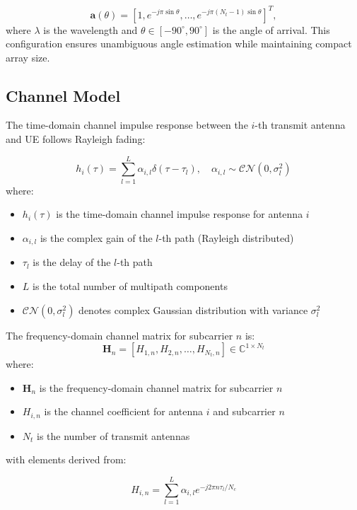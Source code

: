 \documentclass[lettersize,journal]{IEEEtran}
\begin{document}
\begin{equation}
	\mathbf{a}(\theta) = \left[1, e^{-j\pi\sin\theta}, \dots, e^{-j\pi(N_t-1)\sin\theta}\right]^T,
\end{equation}
where $\lambda$ is the wavelength and $\theta \in [-90^\circ, 90^\circ]$ is the angle of arrival. This configuration ensures unambiguous angle estimation while maintaining compact array size.

\subsection{Channel Model}
The time-domain channel impulse response between the $i$-th transmit antenna and UE follows Rayleigh fading:


\begin{equation}
	h_i(\tau) = \sum_{l=1}^L \alpha_{i,l} \delta(\tau-\tau_l), \quad \alpha_{i,l} \sim \mathcal{CN}(0,\sigma_l^2)
	\label{eq:channel_impulse}
\end{equation}
where:
\begin{itemize}
    \item $h_i(\tau)$ is the time-domain channel impulse response for antenna $i$
    \item $\alpha_{i,l}$ is the complex gain of the $l$-th path (Rayleigh distributed)
    \item $\tau_l$ is the delay of the $l$-th path
    \item $L$ is the total number of multipath components
    \item $\mathcal{CN}(0,\sigma_l^2)$ denotes complex Gaussian distribution with variance $\sigma_l^2$
\end{itemize}
The frequency-domain channel matrix for subcarrier $n$ is:
\[
\mathbf{H}_n = \left[H_{1,n}, H_{2,n}, \dots, H_{N_t,n}\right] \in \mathbb{C}^{1 \times N_t}
\]
where:
\begin{itemize}
    \item $\mathbf{H}_n$ is the frequency-domain channel matrix for subcarrier $n$
    \item $H_{i,n}$ is the channel coefficient for antenna $i$ and subcarrier $n$
    \item $N_t$ is the number of transmit antennas
\end{itemize}
with elements derived from:

\begin{equation}
	H_{i,n} = \sum_{l=1}^L \alpha_{i,l} e^{-j2\pi n \tau_l/N_c}
	\label{eq:freq_response}
\end{equation}
\end{document}
